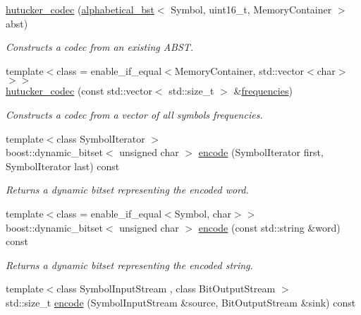 \begin{DoxyCompactItemize}
\item 
\mbox{\hyperlink{classirk_1_1coding_1_1hutucker__codec_a7f078fd7029ad74ebd8aa5fab70fbc8c}{hutucker\+\_\+codec}} (\mbox{\hyperlink{classirk_1_1alphabetical__bst}{alphabetical\+\_\+bst}}$<$ Symbol, uint16\+\_\+t, Memory\+Container $>$ abst)
\begin{DoxyCompactList}\small\item\em Constructs a codec from an existing A\+B\+ST. \end{DoxyCompactList}\item 
{\footnotesize template$<$class  = enable\+\_\+if\+\_\+equal$<$\+Memory\+Container, std\+::vector$<$char$>$$>$$>$ }\\\mbox{\hyperlink{classirk_1_1coding_1_1hutucker__codec_afbe980e04113a8874acd6ecb1f26b094}{hutucker\+\_\+codec}} (const std\+::vector$<$ std\+::size\+\_\+t $>$ \&\mbox{\hyperlink{irk-uncompress_8cpp_a2cd80733ced3d7eda8a6de0389cccc73}{frequencies}})
\begin{DoxyCompactList}\small\item\em Constructs a codec from a vector of all symbols\textquotesingle{} frequencies. \end{DoxyCompactList}\item 
{\footnotesize template$<$class Symbol\+Iterator $>$ }\\boost\+::dynamic\+\_\+bitset$<$ unsigned char $>$ \mbox{\hyperlink{classirk_1_1coding_1_1hutucker__codec_a7bb02638e686dd00d98150829134cd6d}{encode}} (Symbol\+Iterator first, Symbol\+Iterator last) const
\begin{DoxyCompactList}\small\item\em Returns a dynamic bitset representing the encoded word. \end{DoxyCompactList}\item 
{\footnotesize template$<$class  = enable\+\_\+if\+\_\+equal$<$\+Symbol, char$>$$>$ }\\boost\+::dynamic\+\_\+bitset$<$ unsigned char $>$ \mbox{\hyperlink{classirk_1_1coding_1_1hutucker__codec_a5acf6a2691318d5b6a1451800a4e4317}{encode}} (const std\+::string \&word) const
\begin{DoxyCompactList}\small\item\em Returns a dynamic bitset representing the encoded string. \end{DoxyCompactList}\item 
{\footnotesize template$<$class Symbol\+Input\+Stream , class Bit\+Output\+Stream $>$ }\\std\+::size\+\_\+t \mbox{\hyperlink{classirk_1_1coding_1_1hutucker__codec_a536d7952971781338612f77d4a689915}{encode}} (Symbol\+Input\+Stream \&source, Bit\+Output\+Stream \&sink) const

\end{DoxyCompactItemize}
